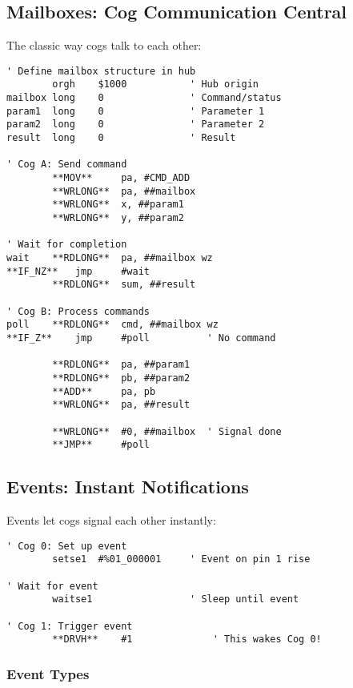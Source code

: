 \documentclass[11pt]{book}
\begin{document}
\hypertarget{mailboxes-cog-communication-central}{%
\subsection{Mailboxes: Cog Communication
Central}\label{mailboxes-cog-communication-central}}

The classic way cogs talk to each other:

\begin{lstlisting}
' Define mailbox structure in hub
        orgh    $1000           ' Hub origin
mailbox long    0               ' Command/status
param1  long    0               ' Parameter 1
param2  long    0               ' Parameter 2  
result  long    0               ' Result

' Cog A: Send command
        **MOV**     pa, #CMD_ADD
        **WRLONG**  pa, ##mailbox
        **WRLONG**  x, ##param1
        **WRLONG**  y, ##param2
        
' Wait for completion
wait    **RDLONG**  pa, ##mailbox wz
**IF_NZ**   jmp     #wait
        **RDLONG**  sum, ##result

' Cog B: Process commands
poll    **RDLONG**  cmd, ##mailbox wz
**IF_Z**    jmp     #poll          ' No command
        
        **RDLONG**  pa, ##param1
        **RDLONG**  pb, ##param2
        **ADD**     pa, pb
        **WRLONG**  pa, ##result
        
        **WRLONG**  #0, ##mailbox  ' Signal done
        **JMP**     #poll
\end{lstlisting}

\hypertarget{events-instant-notifications}{%
\subsection{Events: Instant
Notifications}\label{events-instant-notifications}}

Events let cogs signal each other instantly:

\begin{lstlisting}
' Cog 0: Set up event
        setse1  #%01_000001     ' Event on pin 1 rise
        
' Wait for event
        waitse1                 ' Sleep until event

' Cog 1: Trigger event
        **DRVH**    #1              ' This wakes Cog 0!
\end{lstlisting}

\hypertarget{event-types}{%
\subsubsection{Event Types}\label{event-types}}
\end{document}

